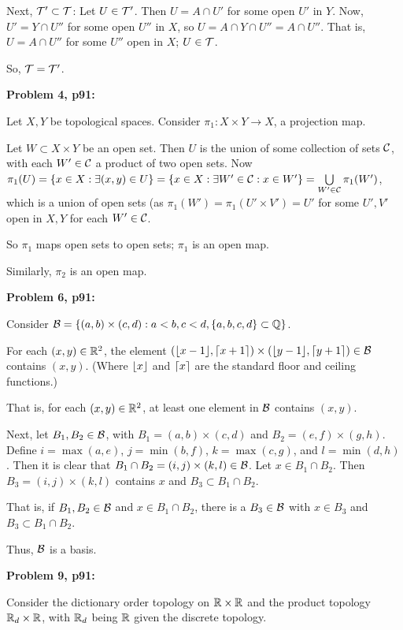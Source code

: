 \documentclass[a4paper,12pt]{article}
\begin{document}
Next, $\mathcal{T}' \subset \mathcal{T}$: Let $U \in \mathcal{T}'$. Then $U = A \cap U'$ for some open $U'$ in $Y$. Now, $U' = Y \cap U''$ for some open $U''$ in $X$, so $U = A \cap Y \cap U'' = A \cap U''$. That is, $U = A \cap U''$ for some $U''$ open in $X$; $U \in \mathcal{T}$.

So, $\mathcal{T} = \mathcal{T}'$.

\shunt

{\bf Problem 4, p91:}

Let $X, Y$ be topological spaces. Consider $\pi_1: X \times Y \to X$, a projection map.

Let $W \subset X \times Y$ be an open set. Then $U$ is the union of some collection of sets $\mathcal{C}$, with each $W' \in \mathcal{C}$ a product of two open sets. Now $\pi_1(U) = \{x \in X: \exists (x,y) \in U\} = \{x \in X: \exists W' \in \mathcal{C}: x \in W'\} = \bigcup\limits_{W' \in \mathcal{C}} \pi_1(W')$, which is a union of open sets (as $\pi_1(W') = \pi_1(U' \times V') = U'$ for some $U',V'$ open in $X, Y$ for each $W' \in \mathcal{C}$.

So $\pi_1$ maps open sets to open sets; $\pi_1$ is an open map.

Similarly, $\pi_2$ is an open map.

\shunt

{\bf Problem 6, p91:}

Consider $\mathcal{B}=\{(a,b) \times (c,d) : a<b, c<d, \{a,b,c,d\} \subset \mathbb{Q}\}$. 

For each $(x,y) \in \mathbb{R}^2$, the element $(\lfloor x-1\rfloor, \lceil x+1\rceil) \times (\lfloor y-1\rfloor,\lceil y+1\rceil) \in \mathcal{B}$ contains $(x,y)$. (Where $\lfloor x\rfloor$ and $\lceil x\rceil$ are the standard floor and ceiling functions.)

That is, for each $(x,y) \in \mathbb{R}^2$, at least one element in $\mathcal{B}$ contains $(x,y)$.

Next, let $B_1, B_2 \in \mathcal{B}$, with $B_1 =(a,b) \times (c,d)$ and $B_2 =(e,f) \times (g,h)$. Define $i = \max(a,e)$, $j = \min(b,f)$, $k =\max(c,g)$, and $l = \min(d,h)$. Then it is clear that $B_1 \cap B_2 = (i,j) \times (k,l) \in \mathcal{B}$.  Let $x \in B_1 \cap B_2$. Then $B_3 = (i,j) \times (k,l)$ contains $x$ and $B_3 \subset B_1 \cap B_2$.

That is, if $B_1, B_2 \in \mathcal{B}$ and $x \in B_1 \cap B_2$, there is a $B_3 \in \mathcal{B}$ with $x \in B_3$ and $B_3 \subset B_1 \cap B_2$.

Thus, $\mathcal{B}$ is a basis.

\shunt

{\bf Problem 9, p91:}

Consider the dictionary order topology on $\mathbb{R} \times \mathbb{R}$ and the product topology $\mathbb{R}_d \times \mathbb{R}$, with $\mathbb{R}_d$ being $\mathbb{R}$ given the discrete topology.
\end{document}
